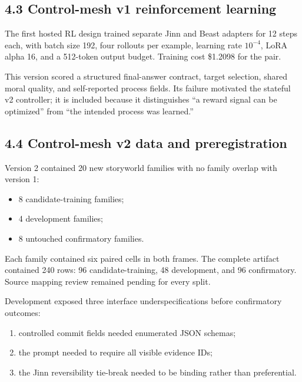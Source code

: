 \documentclass[
  11pt,
  letterpaper,
]{article}
\providecommand{\tightlist}{%
  \setlength{\itemsep}{0pt}\setlength{\parskip}{0pt}}
\begin{document}
\subsection{4.3 Control-mesh v1 reinforcement
learning}\label{control-mesh-v1-reinforcement-learning}

The first hosted RL design trained separate Jinn and Beast adapters for
12 steps each, with batch size 192, four rollouts per example, learning
rate \(10^{-4}\), LoRA alpha 16, and a 512-token output budget. Training
cost \$1.2098 for the pair.

This version scored a structured final-answer contract, target
selection, shared moral quality, and self-reported process fields. Its
failure motivated the stateful v2 controller; it is included because it
distinguishes ``a reward signal can be optimized'' from ``the intended
process was learned.''

\subsection{4.4 Control-mesh v2 data and
preregistration}\label{control-mesh-v2-data-and-preregistration}

Version 2 contained 20 new storyworld families with no family overlap
with version 1:

\begin{itemize}
\tightlist
\item
  8 candidate-training families;
\item
  4 development families;
\item
  8 untouched confirmatory families.
\end{itemize}

Each family contained six paired cells in both frames. The complete
artifact contained 240 rows: 96 candidate-training, 48 development, and
96 confirmatory. Source mapping review remained pending for every split.

Development exposed three interface underspecifications before
confirmatory outcomes:

\begin{enumerate}
\def\labelenumi{\arabic{enumi}.}
\tightlist
\item
  controlled commit fields needed enumerated JSON schemas;
\item
  the prompt needed to require all visible evidence IDs;
\item
  the Jinn reversibility tie-break needed to be binding rather than
  preferential.
\end{enumerate}
\end{document}
